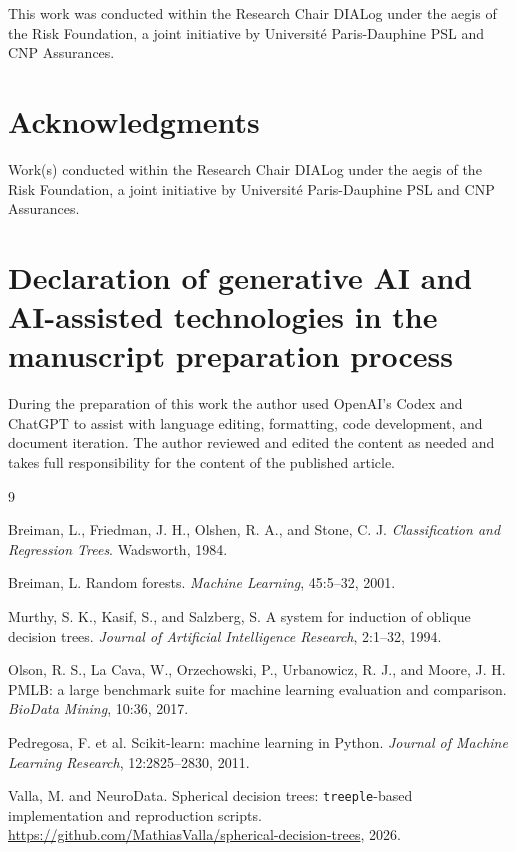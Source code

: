 \documentclass[final,5p,times,twocolumn]{elsarticle}
\begin{document}
This work was conducted within the Research Chair DIALog under the aegis of the
Risk Foundation, a joint initiative by Universit\'e Paris-Dauphine PSL and CNP
Assurances.

\section*{Acknowledgments}

Work(s) conducted within the Research Chair DIALog under the aegis of the Risk
Foundation, a joint initiative by Universit\'e Paris-Dauphine PSL and CNP
Assurances.

\section*{Declaration of generative AI and AI-assisted technologies in the manuscript preparation process}

During the preparation of this work the author used OpenAI's Codex and ChatGPT
to assist with language editing, formatting, code development, and document
iteration. The author reviewed and edited the content as needed and takes full
responsibility for the content of the published article.

\begin{thebibliography}{9}

Breiman, L., Friedman, J. H., Olshen, R. A., and Stone, C. J.
\newblock \emph{Classification and Regression Trees}.
\newblock Wadsworth, 1984.

Breiman, L.
\newblock Random forests.
\newblock \emph{Machine Learning}, 45:5--32, 2001.

Murthy, S. K., Kasif, S., and Salzberg, S.
\newblock A system for induction of oblique decision trees.
\newblock \emph{Journal of Artificial Intelligence Research}, 2:1--32, 1994.

Olson, R. S., La Cava, W., Orzechowski, P., Urbanowicz, R. J., and Moore, J. H.
\newblock PMLB: a large benchmark suite for machine learning evaluation and
comparison.
\newblock \emph{BioData Mining}, 10:36, 2017.

Pedregosa, F. et al.
\newblock Scikit-learn: machine learning in Python.
\newblock \emph{Journal of Machine Learning Research}, 12:2825--2830, 2011.

Valla, M. and NeuroData.
\newblock Spherical decision trees: \texttt{treeple}-based implementation and
reproduction scripts.
\newblock \url{https://github.com/MathiasValla/spherical-decision-trees}, 2026.

\end{thebibliography}
\end{document}

